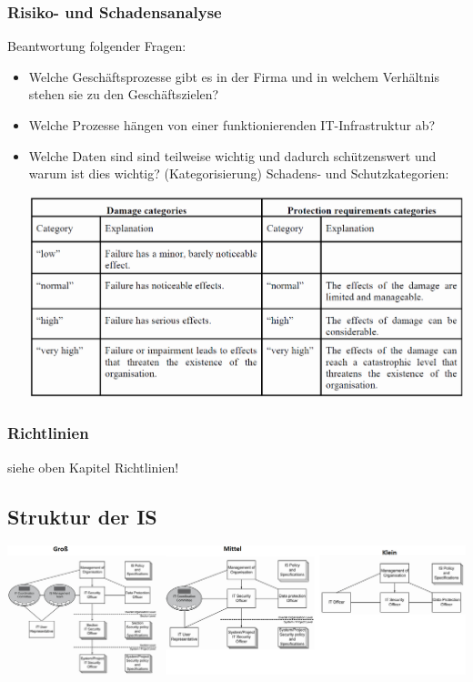 \documentclass{article} %
\begin{document}
\subsubsection{Risiko- und Schadensanalyse}
Beantwortung folgender Fragen:
\begin{itemize}
	\item Welche Geschäftsprozesse gibt es in der Firma und in welchem Verhältnis stehen sie zu den Geschäftszielen?
    \item Welche Prozesse hängen von einer funktionierenden IT-Infrastruktur ab?
    \item Welche Daten sind sind teilweise wichtig und dadurch schützenswert und warum ist dies wichtig? (Kategorisierung)
Schadens- und Schutzkategorien:
\begin{center}
	\includegraphics[width=16cm]{img/categories.png}
\end{center}
\end{itemize}
\subsubsection{Richtlinien}
siehe oben Kapitel Richtlinien!
\subsection{Struktur der IS}

\begin{center}
	\includegraphics[width=18cm]{img/IS.png}
\end{center}
\end{document}
